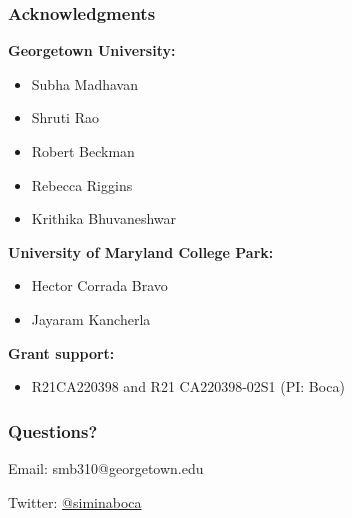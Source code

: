 \documentclass{beamer}
\begin{document}

\begin{frame}
\frametitle{Acknowledgments}

\textbf{Georgetown University:}
\begin{itemize}
\item Subha Madhavan
\item Shruti Rao
\item Robert Beckman
\item Rebecca Riggins
\item Krithika Bhuvaneshwar
\end{itemize}

\textbf{University of Maryland College Park:}
\begin{itemize}
\item Hector Corrada Bravo
\item Jayaram Kancherla
\end{itemize}

\textbf{Grant support:}
\begin{itemize}
\item R21CA220398 and R21 CA220398-02S1 (PI: Boca)
\end{itemize}

\end{frame}


\begin{frame}
\frametitle{Questions?}

Email: smb310@georgetown.edu \\ \vspace{0.2cm}

Twitter: \href{https://twitter.com/siminaboca}{@siminaboca}

\end{frame}


\end{document}
